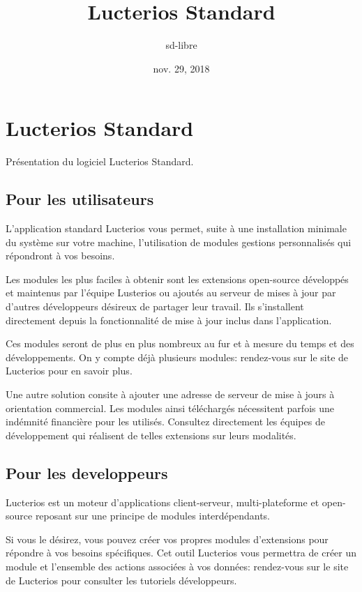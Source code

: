\documentclass[letterpaper,10pt,french]{sphinxmanual}
\title{Lucterios Standard}
\date{nov. 29, 2018}
\author{sd-libre}
\begin{document}
\maketitle
\sphinxtableofcontents
{}\label{\detokenize{index::doc}}



\chapter{Lucterios Standard}
\label{\detokenize{standard/index:lucterios-standard}}\label{\detokenize{standard/index:sommaire}}\label{\detokenize{standard/index::doc}}
Présentation du logiciel Lucterios Standard.


\section{Pour les utilisateurs}
\label{\detokenize{standard/index:pour-les-utilisateurs}}
L’application standard Lucterios vous permet, suite à une installation minimale du système sur votre machine, l’utilisation de modules gestions personnalisés qui répondront à vos besoins.

Les modules les plus faciles à obtenir sont les extensions open-source développés et maintenus par l’équipe Lusterios ou ajoutés au serveur de mises à jour par d’autres développeurs désireux de partager leur travail. Ils s’installent directement depuis la fonctionnalité de mise à jour inclus dans l’application.

Ces modules seront de plus en plus nombreux au fur et à mesure du temps et des développements. On y compte déjà plusieurs modules: rendez-vous sur le site de Lucterios pour en savoir plus.

Une autre solution consite à ajouter une adresse de serveur de mise à jours à orientation commercial. Les modules ainsi téléchargés nécessitent parfois une indémnité financière pour les utilisés. Consultez directement les équipes de développement qui réalisent de telles extensions sur leurs modalités.


\section{Pour les developpeurs}
\label{\detokenize{standard/index:pour-les-developpeurs}}
Lucterios est un moteur d’applications client-serveur, multi-plateforme et open-source reposant sur une principe de modules interdépendants.

Si vous le désirez, vous pouvez créer vos propres modules d’extensions pour répondre à vos besoins spécifiques.
Cet outil Lucterios vous permettra de créer un module et l’ensemble des actions associées à vos données: rendez-vous sur le site de Lucterios pour consulter les tutoriels développeurs.
\end{document}
